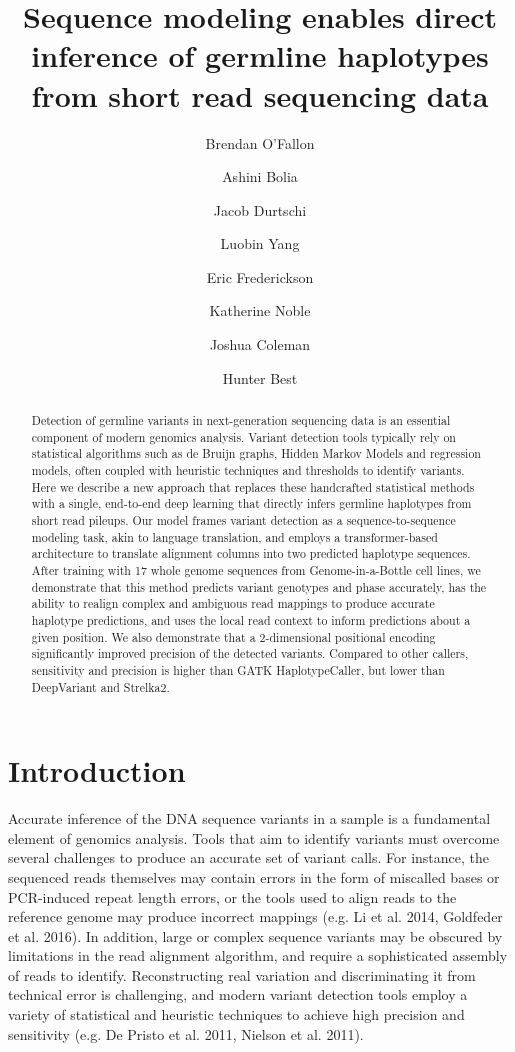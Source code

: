 \documentclass[]{article}
\title{Sequence modeling enables direct inference of germline haplotypes from short read sequencing data}
\author[1]{Brendan O'Fallon}
\author[1]{Ashini Bolia}
\author[1]{Jacob Durtschi}
\author[1]{Luobin Yang}
\author[1]{Eric Frederickson}
\author[1]{Katherine Noble}
\author[1]{Joshua Coleman}
\author[1]{Hunter Best}
\affil[1]{ARUP Institute for Clinical and Experimental Pathology, Salt Lake City, UT}
\date{}
\begin{document}
\maketitle

\begin{abstract}
	Detection of germline variants in next-generation sequencing data is an essential component of modern genomics analysis. Variant detection tools typically rely on statistical algorithms such as de Bruijn graphs, Hidden Markov Models and regression models, often coupled with heuristic techniques and thresholds to identify variants. Here we describe a new approach that replaces these handcrafted statistical methods with a single, end-to-end deep learning that directly infers germline haplotypes from short read pileups. Our model frames variant detection as a sequence-to-sequence modeling task, akin to language translation, and employs a transformer-based architecture to translate alignment columns into two predicted haplotype sequences. After training with 17 whole genome sequences from Genome-in-a-Bottle cell lines, we demonstrate that this method predicts variant genotypes and phase accurately, has the ability to realign complex and ambiguous read mappings to produce accurate haplotype predictions, and uses the local read context to inform predictions about a given position. We also demonstrate that a 2-dimensional positional encoding significantly improved precision of the detected variants. Compared to other callers, sensitivity and precision is higher than GATK HaplotypeCaller, but lower than DeepVariant and Strelka2. 
\end{abstract}


\section{Introduction}

Accurate inference of the DNA sequence variants in a sample is a fundamental element of genomics analysis. Tools that aim to identify variants must overcome several challenges to produce an accurate set of variant calls. For instance, the sequenced reads themselves may contain errors in the form of miscalled bases or PCR-induced repeat length errors, or the tools used to align reads to the reference genome may produce incorrect mappings (e.g. Li et al. 2014, Goldfeder et al. 2016).  In addition, large or complex sequence variants may be obscured by limitations in the read alignment algorithm, and require a sophisticated assembly of reads to identify. Reconstructing real variation and discriminating it from technical error is challenging, and modern variant detection tools employ a variety of statistical and heuristic techniques to achieve high precision and sensitivity (e.g. De Pristo et al. 2011, Nielson et al. 2011). 
\end{document}
